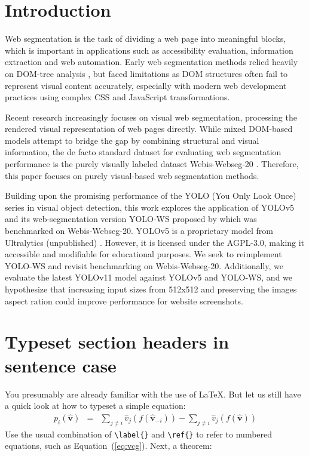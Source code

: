 \documentclass{ecai}
\begin{document}

\section{Introduction}
Web segmentation is the task of dividing a web page into meaningful blocks, which is important in applications such as accessibility evaluation, information extraction and web automation. Early web segmentation methods relied heavily on DOM-tree analysis \cite{VIPS, DOM-structure, HEPS}, but faced limitations as DOM structures often fail to represent visual content accurately, especially with modern web development practices using complex CSS and JavaScript transformations.

Recent research increasingly focuses on visual web segmentation, processing the rendered visual representation of web pages directly. While mixed DOM-based models attempt to bridge the gap by combining structural and visual information, the de facto standard dataset for evaluating web segmentation performance is the purely visually labeled dataset Webis-Webseg-20 \cite{kiesel:2020b}. Therefore, this paper focuses on purely visual-based web segmentation methods.

Building upon the promising performance of the YOLO (You Only Look Once) series in visual object detection, this work explores the application of YOLOv5 and its web-segmentation version YOLO-WS proposed by \cite{YOLO-WS} which was benchmarked on Webis-Webseg-20. YOLOv5 is a proprietary model from Ultralytics (unpublished) \cite{yolov5}. However, it is licensed under the AGPL-3.0, making it accessible and modifiable for educational purposes. We seek to reimplement YOLO-WS and revisit benchmarking on Webis-Webseg-20. Additionally, we evaluate the latest YOLOv11 model against YOLOv5 and YOLO-WS, and we hypothesize that increasing input sizes from 512x512 and preserving the images aspect ration could improve performance for website screenshots.


\section{Typeset section headers in sentence case}

You presumably are already familiar with the use of \LaTeX. But let 
us still have a quick look at how to typeset a simple equation: 
%
\begin{eqnarray}\label{eq:vcg}
p_i(\boldsymbol{\hat{v}}) & = &
\sum_{j \neq i} \hat{v}_j(f(\boldsymbol{\hat{v}}_{-i})) - 
\sum_{j \neq i} \hat{v}_j(f(\boldsymbol{\hat{v}})) 
\end{eqnarray}
%
Use the usual combination of \verb|\label{}| and \verb|\ref{}| to 
refer to numbered equations, such as Equation~(\ref{eq:vcg}). 
Next, a theorem: 
\end{document}

